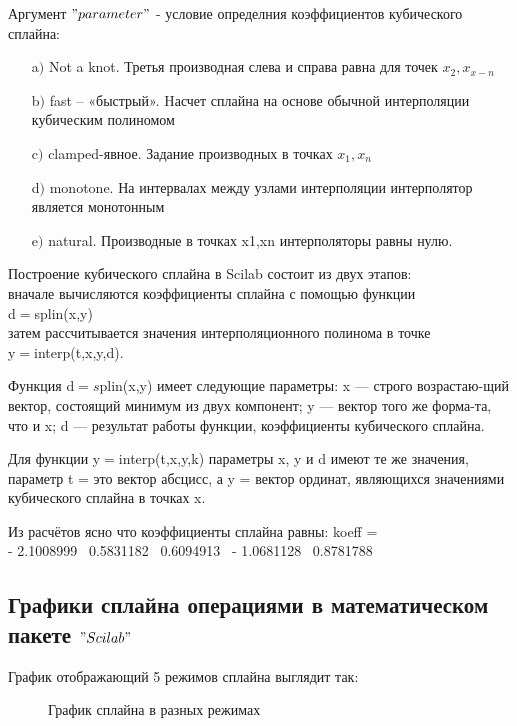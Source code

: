 \documentclass[russian,utf8,nocolumnxxxi,nocolumnxxxii]{eskdtext}
\begin{document}
Аргумент $"parameter"$ - условие определния коэффициентов кубического сплайна:
\begin{enumerate}
  \item[a$)$] Not \makebox[0,3cm]{\hrulefill} a             \makebox[0,3cm]{\hrulefill} knot. Третья производная слева и справа равна для точек $x_2,x_{x-n}$
  \item[b$)$] fast – «быстрый». Hасчет сплайна на основе обычной интерполяции кубическим полиномом
  \item[c$)$] clamped-явное. Задание производных в точках $x_1,x_n$
  \item[d$)$] monotone. На интервалах между узлами интерполяции интерполятор является монотонным
  \item[e$)$] natural. Производные в точках x1,xn интерполяторы равны нулю.
\end{enumerate}

Построение кубического сплайна в Scilab состоит из двух этапов:\\ вначале вычисляются коэффициенты сплайна с помощью функции\\ d$=$splin(x,y)\\

затем рассчитывается значения интерполяционного полинома в точке\\ y$=$interp(t,x,y,d).

Функция d$=s$plin(x,y) имеет следующие параметры: x — строго возрастаю-щий вектор, состоящий минимум из двух компонент; y — вектор того же форма-та, что и x; d — результат работы функции, коэффициенты кубического сплайна.

Для функции y$=$interp(t,x,y,k) параметры x, y и d имеют те же значения,
параметр t = это вектор абсцисс, а y = вектор ординат, являющихся значениями
кубического сплайна в точках x.

Из расчётов ясно что коэффициенты сплайна равны:
koeff  =\\

  - 2.1008999 \   0.5831182  \  0.6094913 \ - 1.0681128 \   0.8781788 \\
  \newpage
\subsection{Графики сплайна операциями в математическом пакете $"Scilab"$}
    

График отображающий 5 режимов сплайна выглядит так:
\begin{figure}[h!]
\caption*{График сплайна в разных режимах}
\end{figure}
\end{document}
